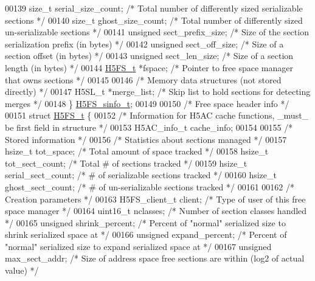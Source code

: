 \begin{DoxyCode}
00139     \textcolor{keywordtype}{size\_t} serial\_size\_count;   \textcolor{comment}{/* Total number of differently sized serializable sections */}
00140     \textcolor{keywordtype}{size\_t} ghost\_size\_count;    \textcolor{comment}{/* Total number of differently sized un-serializable sections */}
00141     \textcolor{keywordtype}{unsigned} sect\_prefix\_size;  \textcolor{comment}{/* Size of the section serialization prefix (in bytes) */}
00142     \textcolor{keywordtype}{unsigned} sect\_off\_size;     \textcolor{comment}{/* Size of a section offset (in bytes)        */}
00143     \textcolor{keywordtype}{unsigned} sect\_len\_size;     \textcolor{comment}{/* Size of a section length (in bytes)        */}
00144     \hyperlink{struct_h5_f_s__t}{H5FS\_t} *fspace;             \textcolor{comment}{/* Pointer to free space manager that owns sections */}
00145 
00146 \textcolor{comment}{/* Memory data structures (not stored directly) */}
00147     H5SL\_t *merge\_list;         \textcolor{comment}{/* Skip list to hold sections for detecting merges */}
00148 \} \hyperlink{struct_h5_f_s__sinfo__t}{H5FS\_sinfo\_t};
00149 
00150 \textcolor{comment}{/* Free space header info */}
00151 \textcolor{keyword}{struct }\hyperlink{struct_h5_f_s__t}{H5FS\_t} \{
00152     \textcolor{comment}{/* Information for H5AC cache functions, \_must\_ be first field in structure */}
00153     H5AC\_info\_t cache\_info;
00154 
00155 \textcolor{comment}{/* Stored information */}
00156     \textcolor{comment}{/* Statistics about sections managed */}
00157     hsize\_t tot\_space;          \textcolor{comment}{/* Total amount of space tracked              */}
00158     hsize\_t tot\_sect\_count;     \textcolor{comment}{/* Total # of sections tracked                */}
00159     hsize\_t serial\_sect\_count;  \textcolor{comment}{/* # of serializable sections tracked         */}
00160     hsize\_t ghost\_sect\_count;   \textcolor{comment}{/* # of un-serializable sections tracked      */}
00161 
00162     \textcolor{comment}{/* Creation parameters */}
00163     H5FS\_client\_t client;       \textcolor{comment}{/* Type of user of this free space manager    */}
00164     uint16\_t nclasses;         \textcolor{comment}{/* Number of section classes handled          */}
00165     \textcolor{keywordtype}{unsigned} shrink\_percent;    \textcolor{comment}{/* Percent of "normal" serialized size to shrink serialized space at */}
00166     \textcolor{keywordtype}{unsigned} expand\_percent;    \textcolor{comment}{/* Percent of "normal" serialized size to expand serialized space at */}
00167     \textcolor{keywordtype}{unsigned} max\_sect\_addr;     \textcolor{comment}{/* Size of address space free sections are within (log2 of actual value) */}

\end{DoxyCode}
